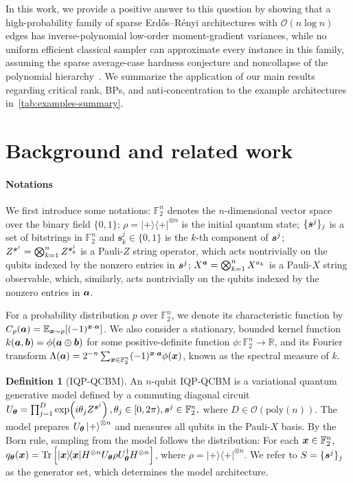 \documentclass{article}
\theoremstyle{plain}
\theoremstyle{definition}
\newtheorem{definition}[theorem]{Definition}
\theoremstyle{remark}
\begin{document}
In this work, we provide a positive answer to this question by showing that a high-probability family of sparse Erd\H{o}s--R\'enyi architectures with $\mathcal{O}(n\log n)$ edges has inverse-polynomial low-order moment-gradient variances, while no uniform efficient classical sampler can approximate every instance in this family, assuming the sparse average-case hardness conjecture and noncollapse of the polynomial hierarchy~\citep{Bremner17}. We summarize the application of our main results regarding critical rank, BPs, and anti-concentration to the example architectures in~\cref{tab:examples-summary}.

\section{Background and related work} \label{sec:background}
\paragraph{Notations} We first introduce some notations: $\mathbb{F}_2^n$ denotes the $n$-dimensional vector space over the binary field $\{0,1\}$; $\rho = |+\rangle\!\langle+|^{\otimes n}$ is the initial quantum state; $\{{\bm{s}^j}\}_j$ is a set of bitstrings in $\mathbb{F}_2^n$ and $\bm{s}_k^j\in\{0,1\}$ is the $k$-th component of ${\bm{s}^j}$; $Z^{{\bm{s}^j}} = \bigotimes_{k=1}^n Z^{\bm{s}_k^j}$ is a Pauli-$Z$ string operator, which acts nontrivially on the qubits indexed by the nonzero entries in ${\bm{s}^j}$; $X^{\bm{a}} = \bigotimes_{k=1}^n X^{a_k}$ is a Pauli-$X$ string observable, which, similarly, acts nontrivially on the qubits indexed by the nonzero entries in ${\bm{a}}$.

For a probability distribution $p$ over $\mathbb{F}_2^n$, we denote its characteristic function by $C_p({\bm{a}}) = \mathbb{E}_{{\bm{x}} \sim p}[(-1)^{{\bm{x}}\cdot {\bm{a}}}]$. We also consider a stationary, bounded kernel function $k({\bm{a}}, {\bm{b}}) = \phi({\bm{a}}\oplus{\bm{b}})$ for some positive-definite function $\phi\colon \mathbb{F}_2^n \to \mathbb{R}$, and its Fourier transform $\Lambda({\bm{a}}) = 2^{-n}\sum_{{\bm{x}}\in\mathbb{F}_2^n} (-1)^{{\bm{x}} \cdot {\bm{a}}} \phi({\bm{x}}) $, known as the spectral measure of $k$.

\begin{definition}[IQP-QCBM]
\label{def:IQP}
An $n$-qubit IQP-QCBM is a variational quantum generative model defined by a commuting diagonal circuit
$U_{{\bm{\theta}}}
=
\prod_{j=1}^D \exp\!\left(i\theta_j Z^{{\bm{s}}^j}\right),
\theta_j \in [0,2\pi), {\bm{s}}^j \in \mathbb F_2^n,$
where $D \in \mathcal O(\mathrm{poly}(n))$. The model prepares
$U_{{\bm{\theta}}}\ket{+}^{\otimes n}$ and measures all qubits in the Pauli-$X$ basis.
By the Born rule, sampling from the model follows the distribution: For each ${\bm{x}} \in \mathbb{F}_2^n$, $
q_{{\bm{\theta}}}({\bm{x}})
=
\operatorname{Tr}
\left[
|{\bm{x}}\rangle\!\langle{\bm{x}}|
H^{\otimes n}
U_{{\bm{\theta}}}\rho U_{{\bm{\theta}}}^{\dagger}
H^{\otimes n}
\right]$, where $\rho = |+\rangle\!\langle+|^{\otimes n}$.
We refer to $S=\{{\bm{s}^j}\}_j$ as the generator set, which determines the model architecture.
\end{definition}
\end{document}
